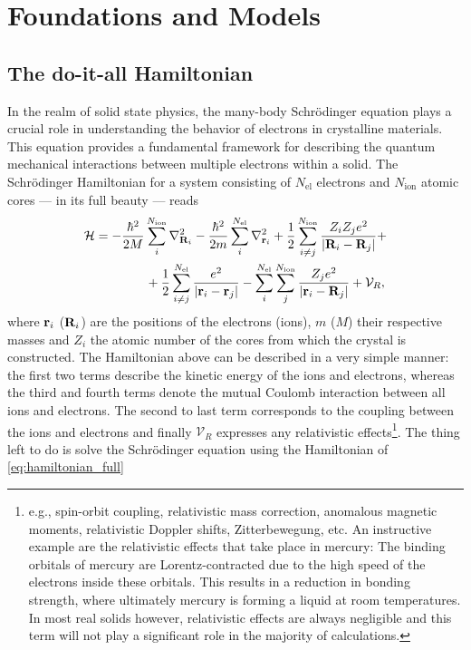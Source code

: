 \documentclass[../../main.tex]{subfiles}
\begin{document}
\chapter{Foundations and Models}

\section{The do-it-all Hamiltonian}

In the realm of solid state physics, the many-body Schrödinger equation plays a crucial role in understanding the behavior of electrons in crystalline materials. This equation provides a fundamental framework for describing the quantum mechanical interactions between multiple electrons within a solid. The Schrödinger Hamiltonian for a system consisting of $N_{\text{el}}$ electrons and $N_{\text{ion}}$ atomic cores --- in its full beauty --- reads
\begin{align}\label{eq:hamiltonian_full}
        \mathcal{H}&=-\frac{\hbar^2}{2M}\sum_{i}^{N_{\text{ion}}}\nabla^2_{\textbf{R}_i}-\frac{\hbar^2}{2m}\sum_{i}^{N_{\text{el}}}\nabla^2_{\textbf{r}_i}+\frac{1}{2}\sum_{i\neq j}^{N_{\text{ion}}}\frac{Z_i Z_j e^2}{|\textbf{R}_i-\textbf{R}_j|}+\nonumber\\
        &\qquad\qquad+\frac{1}{2}\sum_{i\neq j}^{N_{\text{el}}}\frac{e^2}{|\textbf{r}_i-\textbf{r}_j|}-\sum_i^{N_{\text{el}}}\sum_j^{N_{\text{ion}}}\frac{Z_j e^2}{|\textbf{r}_i-\textbf{R}_j|}+\mathcal{V}_R,  
\end{align}
where $\textbf{r}_i$ ($\textbf{R}_i$) are the positions of the electrons (ions), $m$ ($M$) their respective masses and $Z_i$ the atomic number of the cores from which the crystal is constructed. The Hamiltonian above can be described in a very simple manner: the first two terms describe the kinetic energy of the ions and electrons, whereas the third and fourth terms denote the mutual Coulomb interaction between all ions and electrons. The second to last term corresponds to the coupling between the ions and electrons and finally $\mathcal{V}_R$ expresses any relativistic effects\footnote{e.g., spin-orbit coupling, relativistic mass correction, anomalous magnetic moments, relativistic Doppler shifts, Zitterbewegung, etc. An instructive example are the relativistic effects that take place in mercury: The binding orbitals of mercury are Lorentz-contracted due to the high speed of the electrons inside these orbitals. This results in a reduction in bonding strength, where ultimately mercury is forming a liquid at room temperatures. In most real solids however, relativistic effects are always negligible and this term will not play a significant role in the majority of calculations.}. The  thing left to do is solve the Schrödinger equation using the Hamiltonian of \eqref{eq:hamiltonian_full}
\end{document}
